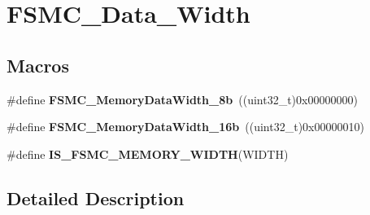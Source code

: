 \hypertarget{group___f_s_m_c___data___width}{\section{F\-S\-M\-C\-\_\-\-Data\-\_\-\-Width}
\label{group___f_s_m_c___data___width}
}
\subsection*{Macros}
\begin{DoxyCompactItemize}
\item 
\hypertarget{group___f_s_m_c___data___width_ga5753e089830f19af70a724766e3c329f}{\#define {\bfseries F\-S\-M\-C\-\_\-\-Memory\-Data\-Width\-\_\-8b}~((uint32\-\_\-t)0x00000000)}\label{group___f_s_m_c___data___width_ga5753e089830f19af70a724766e3c329f}

\item 
\hypertarget{group___f_s_m_c___data___width_ga65d85c3072e6790ae760ca2248e46df6}{\#define {\bfseries F\-S\-M\-C\-\_\-\-Memory\-Data\-Width\-\_\-16b}~((uint32\-\_\-t)0x00000010)}\label{group___f_s_m_c___data___width_ga65d85c3072e6790ae760ca2248e46df6}

\item 
\#define {\bfseries I\-S\-\_\-\-F\-S\-M\-C\-\_\-\-M\-E\-M\-O\-R\-Y\-\_\-\-W\-I\-D\-T\-H}(W\-I\-D\-T\-H)
\end{DoxyCompactItemize}


\subsection{Detailed Description}


